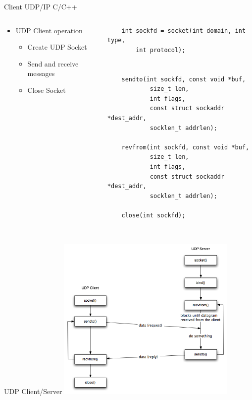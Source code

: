 \begin{frame}[fragile]{Client UDP/IP  C/C++} %
    \begin{columns}
        \begin{column}{0.35\textwidth}
            \begin{itemize}
                \item UDP Client operation
                    \begin{itemize}
                        \item Create UDP Socket
                        \item Send and receive messages
                        \item Close Socket
                    \end{itemize}
            \end{itemize}  
        \end{column}
        \begin{column}{0.65\textwidth}
            \begin{verbatim}
    int sockfd = socket(int domain, int type, 
        int protocol);

    
    sendto(int sockfd, const void *buf, 
            size_t len, 
            int flags, 
            const struct sockaddr *dest_addr, 
            socklen_t addrlen);
    
    revfrom(int sockfd, const void *buf, 
            size_t len, 
            int flags, 
            const struct sockaddr *dest_addr, 
            socklen_t addrlen);

    close(int sockfd);
    
             \end{verbatim}      
        \end{column}   
    \end{columns}
\end{frame}

\begin{frame}{UDP Client/Server}
\centering
    \includegraphics[width=0.65\textwidth]{trainingmaterials/project2-iot/udp-protocol.jpeg}
\end{frame}

